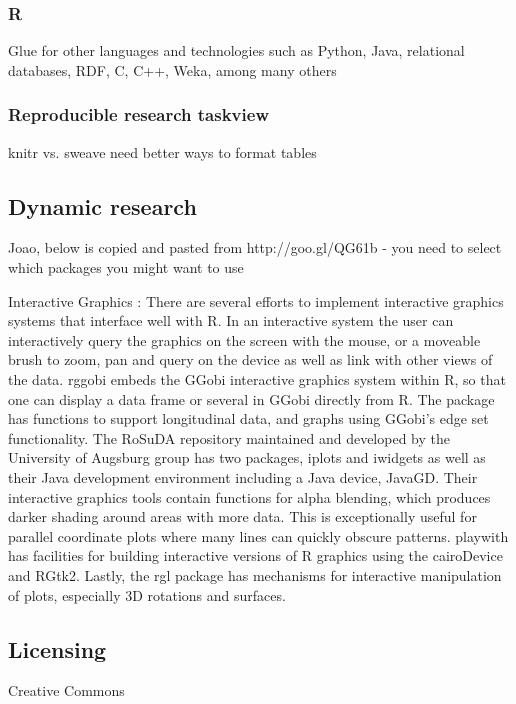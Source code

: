 \documentclass[twoside]{article}
\begin{document}
\begin{multicols}{2}
\subsubsection{R}
Glue for other languages and technologies such as Python, Java, relational databases, RDF, C, C++, Weka, among many others

\subsubsection{Reproducible research taskview}
knitr vs. sweave
need better ways to format tables



\subsection{Dynamic research}

Joao, below is copied and pasted from http://goo.gl/QG61b - you need to select which packages you might want to use

Interactive Graphics : There are several efforts to implement interactive graphics systems that interface well with R. In an interactive system the user can interactively query the graphics on the screen with the mouse, or a moveable brush to zoom, pan and query on the device as well as link with other views of the data. rggobi embeds the GGobi interactive graphics system within R, so that one can display a data frame or several in GGobi directly from R. The package has functions to support longitudinal data, and graphs using GGobi's edge set functionality. The RoSuDA repository maintained and developed by the University of Augsburg group has two packages, iplots and iwidgets as well as their Java development environment including a Java device, JavaGD. Their interactive graphics tools contain functions for alpha blending, which produces darker shading around areas with more data. This is exceptionally useful for parallel coordinate plots where many lines can quickly obscure patterns. playwith has facilities for building interactive versions of R graphics using the cairoDevice and RGtk2. Lastly, the rgl package has mechanisms for interactive manipulation of plots, especially 3D rotations and surfaces.


\subsection{Licensing}
Creative Commons


\end{multicols}
\end{document}
